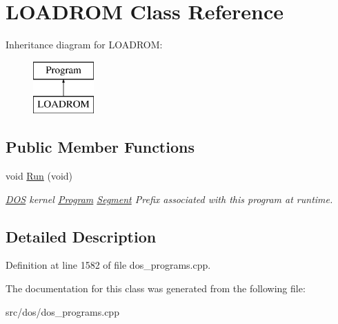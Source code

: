 \hypertarget{classLOADROM}{\section{L\-O\-A\-D\-R\-O\-M Class Reference}
\label{classLOADROM}
}
Inheritance diagram for L\-O\-A\-D\-R\-O\-M\-:\begin{figure}[H]
\begin{center}
\leavevmode
\includegraphics[height=2.000000cm]{classLOADROM}
\end{center}
\end{figure}
\subsection*{Public Member Functions}
\begin{DoxyCompactItemize}
\item 
\hypertarget{classLOADROM_a0d95e173ed8a5de685f6161ade6068f6}{void \hyperlink{classLOADROM_a0d95e173ed8a5de685f6161ade6068f6}{Run} (void)}\label{classLOADROM_a0d95e173ed8a5de685f6161ade6068f6}

\begin{DoxyCompactList}\small\item\em \hyperlink{classDOS}{D\-O\-S} kernel \hyperlink{classProgram}{Program} \hyperlink{structSegment}{Segment} Prefix associated with this program at runtime. \end{DoxyCompactList}\end{DoxyCompactItemize}


\subsection{Detailed Description}


Definition at line 1582 of file dos\-\_\-programs.\-cpp.



The documentation for this class was generated from the following file\-:\begin{DoxyCompactItemize}
\item 
src/dos/dos\-\_\-programs.\-cpp\end{DoxyCompactItemize}
